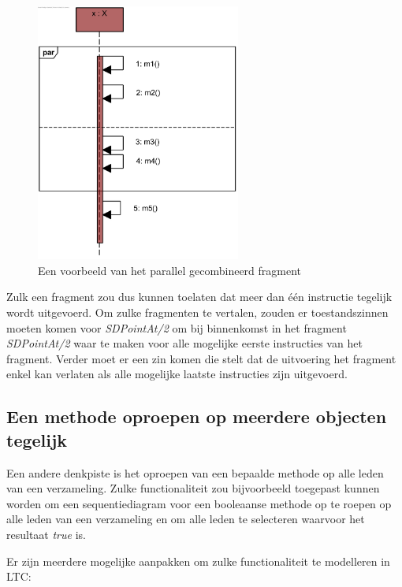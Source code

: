 \begin{figure}
	\centering
	\includegraphics[width=0.6\textwidth]{chap-declaratieve-seq/seq-par.png}
	\caption{Een voorbeeld van het parallel gecombineerd fragment}
	\label{fig:seq-par}
\end{figure}

Zulk een fragment zou dus kunnen toelaten dat meer dan \'e\'en instructie tegelijk wordt uitgevoerd. Om zulke fragmenten te vertalen, zouden er toestandszinnen moeten komen voor \textit{SDPointAt/2} om bij binnenkomst in het fragment \textit{SDPointAt/2} waar te maken voor alle mogelijke eerste instructies van het fragment. Verder moet er een zin komen die stelt dat de uitvoering het fragment enkel kan verlaten als alle mogelijke laatste instructies zijn uitgevoerd.

\subsection{Een methode oproepen op meerdere objecten tegelijk}

Een andere denkpiste is het oproepen van een bepaalde methode op alle leden van een verzameling. Zulke functionaliteit zou bijvoorbeeld toegepast kunnen worden om een sequentiediagram voor een booleaanse methode op te roepen op alle leden van een verzameling en om alle leden te selecteren waarvoor het resultaat \textit{true} is.

Er zijn meerdere mogelijke aanpakken om zulke functionaliteit te modelleren in LTC:

